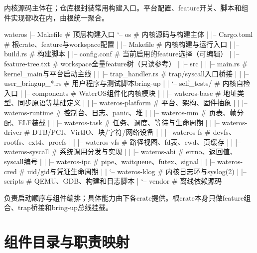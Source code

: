 内核源码主体在；仓库根封装常用构建入口。平台配置、feature开关、脚本和组件实现都收在内，由根统一聚合。

\begin{textcode}
wateros
|-- Makefile                    # 顶层构建入口
`-- os                          # 内核源码与构建主体
|   |-- Cargo.toml              # 根crate、feature与workspace配置
|   |-- Makefile                # 内核构建与运行入口
|   |-- build.rs                # 构建脚本
|   |-- config.conf             # 当前启用的feature选择（可编辑）
|   |-- feature-tree.txt        # workspace全量feature树（只读参考）
|   |-- src
|   |   |-- main.rs             # kernel_main与平台启动主线
|   |   |-- trap_handler.rs     # trap/syscall入口桥接
|   |   |-- user_bringup_*.rs   # 用户程序与测试脚本bring-up
|   |   `-- self_tests/         # 内核自检入口
|   |-- components              # WaterOS组件化内核模块
|   |   |-- wateros-base        # 地址类型、同步原语等基础定义
|   |   |-- wateros-platform    # 平台、架构、固件抽象
|   |   |-- wateros-runtime     # 控制台、日志、panic、堆
|   |   |-- wateros-mm          # 页表、帧分配、ELF装载
|   |   |-- wateros-task        # 任务、调度、等待与生命周期
|   |   |-- wateros-driver      # DTB/PCI、VirtIO、块/字符/网络设备
|   |   |-- wateros-fs          # devfs、rootfs、ext4、procfs
|   |   |-- wateros-vfs         # 路径视图、fd表、cwd、页缓存
|   |   |-- wateros-syscall     # 系统调用分发与实现
|   |   |-- wateros-abi         # errno、返回值、syscall编号
|   |   |-- wateros-ipc         # pipe、waitqueue、futex、signal
|   |   |-- wateros-cred        # uid/gid与凭证生命周期
|   |   `-- wateros-klog        # 内核日志环与syslog(2)
|   |-- scripts                 # QEMU、GDB、构建和日志脚本
|   `-- vendor                  # 离线依赖源码
\end{textcode}

负责启动顺序与组件编排；具体能力由下各crate提供。根crate本身只做feature组合、trap桥接和bring-up总线挂载。


\section{组件目录与职责映射}

